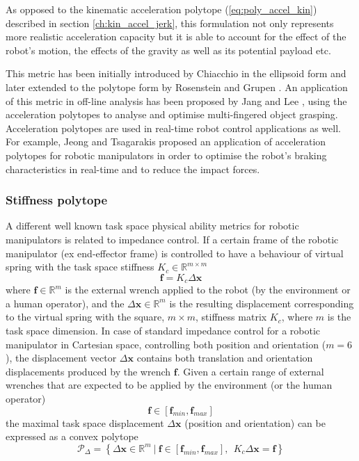 As opposed to the kinematic acceleration polytope (\ref{eq:poly_accel_kin}) described in section \ref{ch:kin_accel_jerk}, this formulation not only represents more realistic acceleration capacity but it is able to account for the effect of the robot's motion, the effects of the gravity as well as its potential payload etc. 

This metric has been initially introduced by Chiacchio \cite{chiacchio_2000} in the ellipsoid form and later extended to the polytope form by  Rosenstein and Grupen \cite{rosenstein2002velocity}. An application of this metric in off-line analysis has been proposed by Jang and Lee \cite{Jang2009}, using the acceleration polytopes to analyse and optimise multi-fingered object grasping. Acceleration polytopes are used in real-time robot control applications as well. For example, Jeong and Tsagarakis \cite{jeong2006optimal} proposed an application of acceleration polytopes for robotic manipulators in order to optimise the robot's braking characteristics in real-time and to reduce the impact forces. 

\subsubsection{Stiffness polytope}
\label{ch:robot_stiffness_poly}
A different well known task space physical ability metrics for robotic manipulators is related to impedance control. If a certain frame of the robotic manipulator (ex end-effector frame) is controlled to have a behaviour of virtual spring with the task space stiffness $K_c \in \mathbb{R}^{m\times m}$
\begin{equation}
    \bm{f} = K_c \Delta\bm{x}
\end{equation}
where $\bm{f}\in\mathbb{R}^m$ is the  external wrench applied to the robot (by the environment or a human operator), and the $\Delta \bm{x}\in\mathbb{R}^m$ is the resulting displacement corresponding to the virtual spring with the square, $m\times m$, stiffness matrix $K_c$, where $m$ is the task space dimension.  In case of standard impedance control for a robotic manipulator in Cartesian space, controlling both position and orientation ($m=6$), the displacement vector $\Delta \bm{x}$ contains both translation and orientation displacements produced by the wrench $\bm{f}$.
Given a certain range of external wrenches that are expected to be applied by the environment (or the human operator) 
\begin{equation}
    \bm{f}\in\left[\bm{f}_{min}, \bm{f}_{max} \right]
    \label{eq:force_stiff_range}
\end{equation}
the maximal task space displacement $\Delta \bm{x}$ (position and orientation) can be expressed as a convex polytope 
\begin{equation}
    \mathcal{P}_\Delta = \left\{ \Delta\bm{x} \in \mathbb{R}^m ~|~ \bm{f}\in\left[\bm{f}_{min}, \bm{f}_{max} \right], ~~ K_c\Delta\bm{x} = \bm{f} \right\}
\end{equation}

